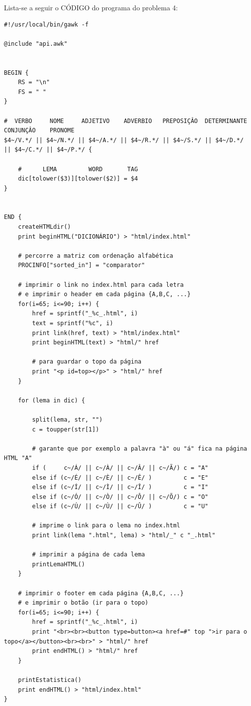 \documentclass[11pt,a4paper]{report}%
\begin{document}
\newpage
Lista-se a seguir o CÓDIGO do programa do problema 4:
\begin{verbatim}
#!/usr/local/bin/gawk -f

@include "api.awk"


BEGIN {
	RS = "\n"
	FS = " "
}

#  VERBO     NOME     ADJETIVO    ADVERBIO   PREPOSIÇÂO  DETERMINANTE  CONJUNÇÂO    PRONOME
$4~/V.*/ || $4~/N.*/ || $4~/A.*/ || $4~/R.*/ || $4~/S.*/ || $4~/D.*/ || $4~/C.*/ || $4~/P.*/ { 	
	
	#      LEMA         WORD       TAG
	dic[tolower($3)][tolower($2)] = $4 
}


END {
	createHTMLdir()
	print beginHTML("DICIONÁRIO") > "html/index.html"

	# percorre a matriz com ordenação alfabética
	PROCINFO["sorted_in"] = "comparator" 

	# imprimir o link no index.html para cada letra 
	# e imprimir o header em cada página {A,B,C, ...}
	for(i=65; i<=90; i++) {
		href = sprintf("_%c_.html", i)
		text = sprintf("%c", i)
		print link(href, text) > "html/index.html"
		print beginHTML(text) > "html/" href

		# para guardar o topo da página
		print "<p id=top></p>" > "html/" href 
	}
	
	for (lema in dic) {
		
		split(lema, str, "")
		c = toupper(str[1]) 

		# garante que por exemplo a palavra "à" ou "á" fica na página HTML "A"
		if (     c~/Á/ || c~/À/ || c~/Â/ || c~/Ã/) c = "A"
		else if (c~/É/ || c~/È/ || c~/Ê/ )         c = "E"
		else if (c~/Í/ || c~/Ì/ || c~/Î/ )         c = "I"
		else if (c~/Ó/ || c~/Ò/ || c~/Ô/ || c~/Õ/) c = "O"
		else if (c~/Ú/ || c~/Ù/ || c~/Û/ )         c = "U"

		# imprime o link para o lema no index.html
		print link(lema ".html", lema) > "html/_" c "_.html" 

		# imprimir a página de cada lema
		printLemaHTML() 
    }
 
    # imprimir o footer em cada página {A,B,C, ...}
    # e imprimir o botão (ir para o topo)
    for(i=65; i<=90; i++) {
		href = sprintf("_%c_.html", i)
		print "<br><br><button type=button><a href=#" top ">ir para o topo</a></button><br><br>" > "html/" href
		print endHTML() > "html/" href
	}

	printEstatistica()
	print endHTML() > "html/index.html"
}



\end{verbatim}
\end{document}
